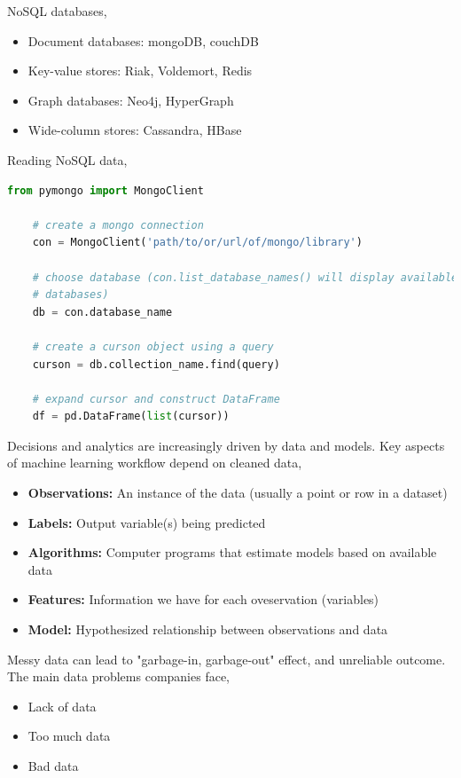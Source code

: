 \documentclass{article}
\theoremstyle{mytheoremstyle}
\theoremstyle{mytheoremstyle}
\theoremstyle{myproblemstyle}
\begin{document}
    \pagebreak

    \noindent NoSQL databases,
    \begin{itemize}
    	\item Document databases: mongoDB, couchDB
	\item Key-value stores: Riak, Voldemort, Redis
	\item Graph databases: Neo4j, HyperGraph
	\item Wide-column stores: Cassandra, HBase
    \end{itemize}

    \noindent Reading NoSQL data,
    \begin{lstlisting}[language=Python]
    from pymongo import MongoClient

    # create a mongo connection
    con = MongoClient('path/to/or/url/of/mongo/library')

    # choose database (con.list_database_names() will display available
    # databases)
    db = con.database_name

    # create a curson object using a query
    curson = db.collection_name.find(query)

    # expand cursor and construct DataFrame
    df = pd.DataFrame(list(cursor))
    \end{lstlisting}

    \noindent Decisions and analytics are increasingly driven by data and
    models. Key aspects of machine learning workflow depend on cleaned
    data,
    \begin{itemize}
    \itemsep0em
	    \item \textbf{Observations: } An instance of the data 
		    (usually a point or row in a dataset)
	    \item \textbf{Labels: } Output variable(s) being predicted
	    \item \textbf{Algorithms: } Computer programs that estimate
		    models based on available data
	    \item \textbf{Features: } Information we have for each
		    oveservation (variables)
	    \item \textbf{Model: } Hypothesized relationship between
		    observations and data
    \end{itemize}
    \noindent Messy data can lead to "garbage-in, garbage-out" effect,
    and unreliable outcome. The main data problems companies face,
    \begin{itemize}
    	\item Lack of data
	\item Too much data
	\item Bad data
    \end{itemize}
\end{document}
